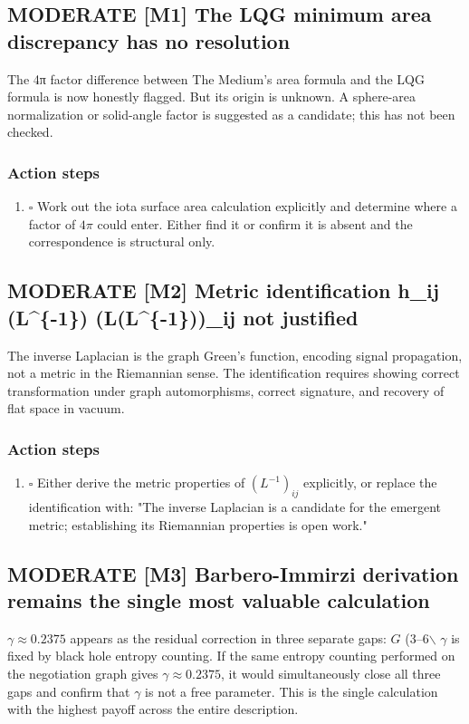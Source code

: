 \documentclass[11pt,letterpaper]{article}
\begin{document}
\subsection{{\bfseries\sffamily MODERATE} [M1] The LQG minimum area discrepancy has no resolution}
\label{sec:org573e79c}
The 4π factor difference between The Medium's area formula and the LQG formula
is now honestly flagged. But its origin is unknown. A sphere-area normalization
or solid-angle factor is suggested as a candidate; this has not been checked.

\subsubsection{Action steps}
\label{sec:orgebb47fa}

\begin{enumerate}
\item{$\square$} Work out the iota surface area calculation explicitly and determine where
a factor of \(4\pi\) could enter. Either find it or confirm it is absent and
the correspondence is structural only.
\end{enumerate}

\subsection{{\bfseries\sffamily MODERATE} [M2] Metric identification h\_ij (L\^{}\{-1\}) (L(L\^{}\{-1\}))\_ij not justified}
\label{sec:org2dbf99a}
The inverse Laplacian is the graph Green's function, encoding signal propagation,
not a metric in the Riemannian sense. The identification requires showing correct
transformation under graph automorphisms, correct signature, and recovery of flat
space in vacuum.

\subsubsection{Action steps}
\label{sec:org998e2d8}

\begin{enumerate}
\item{$\square$} Either derive the metric properties of \((L^{-1})_{ij}\) explicitly, or
replace the identification with: "The inverse Laplacian is a candidate for
the emergent metric; establishing its Riemannian properties is open work."
\end{enumerate}

\subsection{{\bfseries\sffamily MODERATE} [M3] Barbero-Immirzi derivation remains the single most valuable calculation}
\label{sec:org707f609}
\(\gamma \approx 0.2375\) appears as the residual correction in three separate
gaps: \(G\) (3--6$\backslash$%
\(\gamma\) is fixed by black hole entropy counting. If the same entropy counting
performed on the negotiation graph gives \(\gamma \approx 0.2375\), it would
simultaneously close all three gaps and confirm that \(\gamma\) is not a free
parameter. This is the single calculation with the highest payoff across the
entire description.
\end{document}
